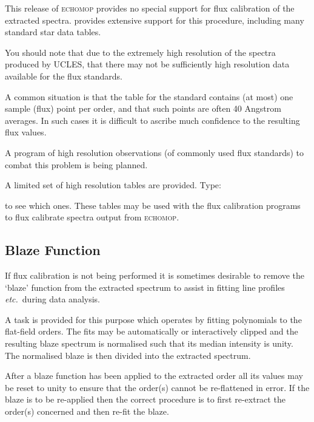 \documentclass[twoside,11pt,nolof]{starlink}
\newcommand{\mlabel}[1]{\xlabel{#1}\label{#1}}
\newcommand{\myindex}[1]{\index{#1}}
\begin{document}
This release of \textsc{echomop} provides no special support for flux
calibration of the extracted spectra.
 provides extensive support for this procedure,
including many standard star data tables.

You should note that due to the extremely high resolution of the
spectra produced by UCLES, that there may not be sufficiently
high resolution data available for the flux standards.

A common situation is that the  table for the
standard contains (at most) one sample (flux) point per order, and that
such points are often 40 Angstrom averages. In such cases it is difficult
to ascribe much confidence to the resulting flux values.

A program of high resolution observations (of commonly used flux
standards) to combat this problem is being planned.

A limited set of high resolution tables are provided. Type:

\begin{terminalv}
\end{terminalv}

to see which ones. These tables may be used with the
 flux calibration programs
to flux calibrate spectra output from \textsc{echomop}.


\subsection{\mlabel{blaze_function}Blaze Function}
\myindex{Blaze}
\myindex{Ripple}

If flux calibration is not being performed it is sometimes desirable
to remove the `blaze' function from the extracted spectrum to assist
in fitting line profiles {\it etc.}\ during data analysis.

A task is provided for this purpose which operates by fitting
polynomials to the flat-field orders. The fits may be automatically
or interactively clipped and the resulting blaze spectrum is
normalised such that its median intensity is unity. The normalised
blaze is then divided into the extracted spectrum.

After a blaze function has been applied to the extracted order all
its values may be reset to unity to ensure that the order(s) cannot
be re-flattened in error. If the blaze is to be
re-applied then the correct procedure is to first re-extract the
order(s) concerned and then re-fit the blaze.
\end{document}

